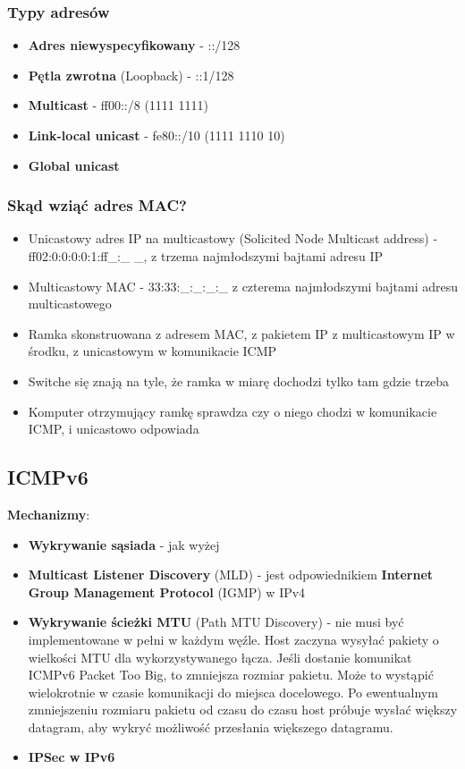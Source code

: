\documentclass[../main.tex]{subfiles}
\begin{document}
    \subsubsection{Typy adresów}
    \begin{itemize}
        \item \textbf{Adres niewyspecyfikowany} - ::/128
        \item \textbf{Pętla zwrotna} (Loopback) - ::1/128
        \item \textbf{Multicast} - ff00::/8 (1111 1111)
        \item \textbf{Link-local unicast} - fe80::/10 (1111 1110 10)
        \item \textbf{Global unicast}
    \end{itemize}


    \subsubsection{Skąd wziąć adres MAC?}
    \begin{itemize}
        \item Unicastowy adres IP na multicastowy (Solicited Node Multicast address) - ff02:0:0:0:0:1:ff\_:\_ \_,
        z trzema najmłodszymi bajtami adresu IP
        \item Multicastowy MAC - 33:33:\_:\_:\_:\_ z czterema najmłodszymi bajtami adresu multicastowego
        \item Ramka skonstruowana z adresem MAC, z pakietem IP z multicastowym IP w środku, z unicastowym w komunikacie ICMP
        \item Switche się znają na tyle, że ramka w miarę dochodzi tylko tam gdzie trzeba
        \item Komputer otrzymujący ramkę sprawdza czy o niego chodzi w komunikacie ICMP, i unicastowo odpowiada
    \end{itemize}

    \subsection{ICMPv6}
    \textbf{Mechanizmy}:
    \begin{itemize}
        \item \textbf{Wykrywanie sąsiada} - jak wyżej
        \item \textbf{Multicast Listener Discovery} (MLD) - jest odpowiednikiem \textbf{Internet Group Management Protocol} (IGMP) w IPv4
        \item \textbf{Wykrywanie ścieżki MTU} (Path MTU Discovery) - nie musi być implementowane w pełni w każdym węźle.
        Host zaczyna wysyłać pakiety o wielkości MTU dla wykorzystywanego łącza.
        Jeśli dostanie komunikat ICMPv6 Packet Too Big, to zmniejsza rozmiar pakietu.
        Może to wystąpić wielokrotnie w czasie komunikacji do miejsca docelowego.
        Po ewentualnym zmniejszeniu rozmiaru pakietu od czasu do czasu host próbuje wysłać
        większy datagram, aby wykryć możliwość przesłania większego datagramu.
        \item \textbf{IPSec w IPv6}
    \end{itemize}
\end{document}
